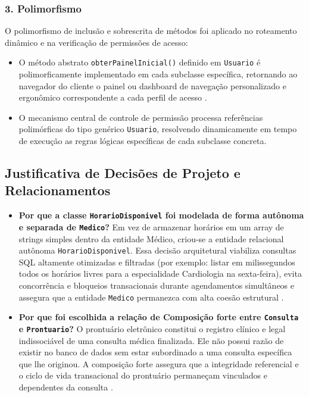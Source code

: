 \subsubsection{3. Polimorfismo}
O polimorfismo de inclusão e sobrescrita de métodos foi aplicado no roteamento dinâmico e na verificação de permissões de acesso:
\begin{itemize}
    \item O método abstrato \texttt{obterPainelInicial()} definido em \texttt{Usuario} é polimorficamente implementado em cada subclasse específica, retornando ao navegador do cliente o painel ou dashboard de navegação personalizado e ergonômico correspondente a cada perfil de acesso \cite{larman2004}.
    \item O mecanismo central de controle de permissão processa referências polimórficas do tipo genérico \texttt{Usuario}, resolvendo dinamicamente em tempo de execução as regras lógicas específicas de cada subclasse concreta.
\end{itemize}

\subsection{Justificativa de Decisões de Projeto e Relacionamentos}

\begin{itemize}
    \item \textbf{Por que a classe \texttt{HorarioDisponivel} foi modelada de forma autônoma e separada de \texttt{Medico}?} \newline
    Em vez de armazenar horários em um array de strings simples dentro da entidade Médico, criou-se a entidade relacional autônoma \texttt{HorarioDisponivel}. Essa decisão arquitetural viabiliza consultas SQL altamente otimizadas e filtradas (por exemplo: listar em milissegundos todos os horários livres para a especialidade Cardiologia na sexta-feira), evita concorrência e bloqueios transacionais durante agendamentos simultâneos e assegura que a entidade \texttt{Medico} permanezca com alta coesão estrutural \cite{larman2004, silberschatz2020}.
    \item \textbf{Por que foi escolhida a relação de Composição forte entre \texttt{Consulta} e \texttt{Prontuario}?} \newline
    O prontuário eletrônico constitui o registro clínico e legal indissociável de uma consulta médica finalizada. Ele não possui razão de existir no banco de dados sem estar subordinado a uma consulta específica que lhe originou. A composição forte assegura que a integridade referencial e o ciclo de vida transacional do prontuário permaneçam vinculados e dependentes da consulta \cite{booch2005}.
\end{itemize}

